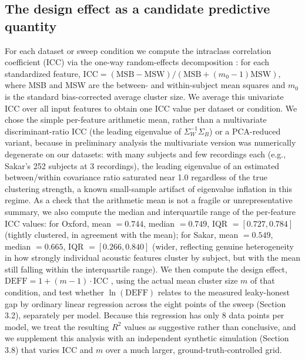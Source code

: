 \documentclass[11pt]{article}
\begin{document}
\subsection{The design effect as a candidate predictive quantity}
For each dataset or sweep condition we compute the intraclass correlation coefficient (ICC) via the one-way random-effects decomposition \cite{shrout1979}: for each standardized feature, $\mathrm{ICC} = (\mathrm{MSB} - \mathrm{MSW})/(\mathrm{MSB} + (m_0-1)\mathrm{MSW})$, where MSB and MSW are the between- and within-subject mean squares and $m_0$ is the standard bias-corrected average cluster size. We average this univariate ICC over all input features to obtain one ICC value per dataset or condition. We chose the simple per-feature arithmetic mean, rather than a multivariate discriminant-ratio ICC (the leading eigenvalue of $\Sigma_W^{-1}\Sigma_B$) or a PCA-reduced variant, because in preliminary analysis the multivariate version was numerically degenerate on our datasets: with many subjects and few recordings each (e.g., Sakar's 252 subjects at 3 recordings), the leading eigenvalue of an estimated between/within covariance ratio saturated near 1.0 regardless of the true clustering strength, a known small-sample artifact of eigenvalue inflation in this regime. As a check that the arithmetic mean is not a fragile or unrepresentative summary, we also compute the median and interquartile range of the per-feature ICC values: for Oxford, mean $=0.744$, median $=0.749$, IQR $=[0.727, 0.784]$ (tightly clustered, in agreement with the mean); for Sakar, mean $=0.549$, median $=0.665$, IQR $=[0.266, 0.840]$ (wider, reflecting genuine heterogeneity in how strongly individual acoustic features cluster by subject, but with the mean still falling within the interquartile range). We then compute the design effect, $\mathrm{DEFF} = 1+(m-1)\cdot\mathrm{ICC}$ \cite{kish1965}, using the actual mean cluster size $m$ of that condition, and test whether $\ln(\mathrm{DEFF})$ relates to the measured leaky-honest gap by ordinary linear regression across the eight points of the sweep (Section 3.2), separately per model. Because this regression has only 8 data points per model, we treat the resulting $R^2$ values as suggestive rather than conclusive, and we supplement this analysis with an independent synthetic simulation (Section 3.8) that varies ICC and $m$ over a much larger, ground-truth-controlled grid.
\end{document}

